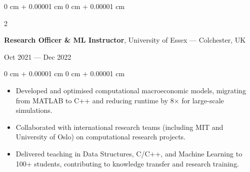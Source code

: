 \documentclass[6pt, letterpaper]{article}
\newenvironment{highlights}{
    \begin{itemize}[
        topsep=0.03 cm,
        parsep=0.03 cm,
        partopsep=0pt,
        itemsep=0pt,
        leftmargin=0 cm + 10pt
    ]
}{
    \end{itemize}
} %
\newenvironment{onecolentry}{
    \begin{adjustwidth}{
        0 cm + 0.00001 cm
    }{
        0 cm + 0.00001 cm
    }
}{
    \end{adjustwidth}
} %
\newenvironment{twocolentry}[2][]{
    \onecolentry
    \def\secondColumn{#2}
    \setcolumnwidth{\fill, 4.5 cm}
    \begin{paracol}{2}
}{
    \switchcolumn \raggedleft \secondColumn
    \end{paracol}
    \endonecolentry
} %
\begin{document}
        \begin{twocolentry}{Oct 2021 --- Dec 2022}
        \textbf{Research Officer \& ML Instructor}, University of Essex --- Colchester, UK
        \end{twocolentry}

        \begin{onecolentry}
        \begin{highlights}

            \item Developed and optimised computational macroeconomic models, migrating from MATLAB to C++ and reducing runtime by 8× for large-scale simulations.
            \item Collaborated with international research teams (including MIT and University of Oslo) on computational research projects.
            \item Delivered teaching in Data Structures, C/C++, and Machine Learning to 100+ students, contributing to knowledge transfer and research training.

        \end{highlights}
        \end{onecolentry}
\end{document}
